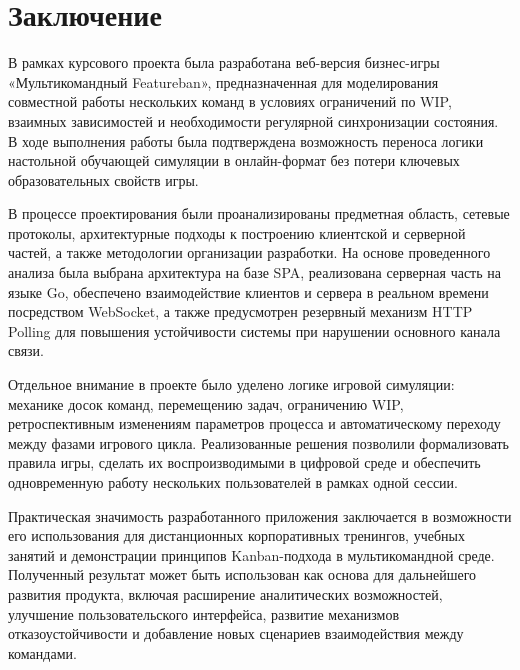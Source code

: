 \section{Заключение}

В рамках курсового проекта была разработана веб-версия бизнес-игры «Мультикомандный Featureban», предназначенная для моделирования совместной работы нескольких команд в условиях ограничений по WIP, взаимных зависимостей и необходимости регулярной синхронизации состояния. В ходе выполнения работы была подтверждена возможность переноса логики настольной обучающей симуляции в онлайн-формат без потери ключевых образовательных свойств игры.

В процессе проектирования были проанализированы предметная область, сетевые протоколы, архитектурные подходы к построению клиентской и серверной частей, а также методологии организации разработки. На основе проведенного анализа была выбрана архитектура на базе SPA, реализована серверная часть на языке Go, обеспечено взаимодействие клиентов и сервера в реальном времени посредством WebSocket, а также предусмотрен резервный механизм HTTP Polling для повышения устойчивости системы при нарушении основного канала связи.

Отдельное внимание в проекте было уделено логике игровой симуляции: механике досок команд, перемещению задач, ограничению WIP, ретроспективным изменениям параметров процесса и автоматическому переходу между фазами игрового цикла. Реализованные решения позволили формализовать правила игры, сделать их воспроизводимыми в цифровой среде и обеспечить одновременную работу нескольких пользователей в рамках одной сессии.

Практическая значимость разработанного приложения заключается в возможности его использования для дистанционных корпоративных тренингов, учебных занятий и демонстрации принципов Kanban-подхода в мультикомандной среде. Полученный результат может быть использован как основа для дальнейшего развития продукта, включая расширение аналитических возможностей, улучшение пользовательского интерфейса, развитие механизмов отказоустойчивости и добавление новых сценариев взаимодействия между командами.
